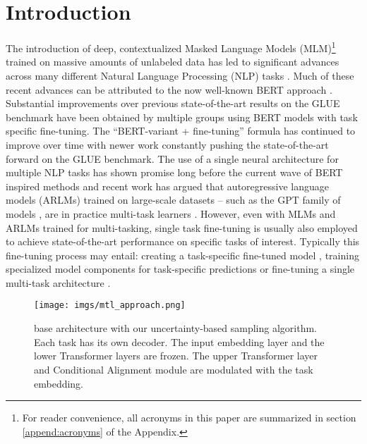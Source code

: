 \documentclass{article} \usepackage{iclr2021_conference,times}
\begin{document}
\section{Introduction}
The introduction of deep, contextualized Masked Language Models (MLM)\footnote{For reader convenience, all acronyms in this paper are summarized in section \ref{append:acronyms} of the Appendix.} trained on massive amounts of unlabeled data has led to significant advances across many different Natural Language Processing (NLP) tasks \citep{word_context,trans_context}. Much of these recent advances can be attributed to the now well-known BERT approach \citep{bert}. Substantial improvements over previous state-of-the-art results on the GLUE benchmark
\citep{wang-etal-2018-glue} have been obtained by multiple groups using BERT models with task specific fine-tuning. The ``BERT-variant + fine-tuning'' formula has continued to improve over time with newer work constantly pushing the state-of-the-art forward on the GLUE benchmark. The use of a single neural architecture for multiple NLP tasks has shown promise long before the current wave of BERT inspired methods \citep{DBLP:conf/icml/CollobertW08} and recent work has argued that autoregressive language models (ARLMs) trained on large-scale datasets -- such as the GPT family of models \citep{Radford2018ImprovingLU}, are in practice multi-task learners \citep{brown2020language}. However, even with MLMs and ARLMs trained for multi-tasking, single task fine-tuning is usually also employed to achieve state-of-the-art performance on specific tasks of interest. 
Typically this fine-tuning process may entail: creating a task-specific fine-tuned model \citep{bert}, training specialized model components for task-specific predictions \citep{DBLP:journals/corr/abs-1902-00751} or fine-tuning a single multi-task architecture \citep{mtl_bert_liu2019}.

\begin{wrapfigure}[17]{r}{0.47\textwidth}
    \begin{center}
      \vspace{-23pt}
      \texttt{[image: imgs/mtl\_approach.png]}
    \end{center}
    \caption{\label{fig:model} \small  base architecture with our uncertainty-based sampling algorithm. Each task has its own decoder. The input embedding layer and the lower Transformer layers are frozen. The upper Transformer layer and Conditional Alignment module are modulated with the task embedding.}
\end{wrapfigure}
\end{document}
